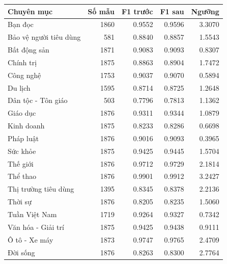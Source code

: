 \begin{tabularx}{\textwidth}{Xrrrr}\toprule
Chuyên mục & Số mẫu & F1 trước & F1 sau & Ngưỡng\\\midrule
Bạn đọc & 1860 & 0.9552 & 0.9596 & 3.3070\\
Bảo vệ người tiêu dùng & 581 & 0.8840 & 0.8857 & 1.5543\\
Bất động sản & 1871 & 0.9083 & 0.9093 & 0.8307\\
Chính trị & 1875 & 0.8863 & 0.8904 & 1.7472\\
Công nghệ & 1753 & 0.9037 & 0.9070 & 0.5894\\
Du lịch & 1595 & 0.8714 & 0.8725 & 1.2648\\
Dân tộc - Tôn giáo & 503 & 0.7796 & 0.7813 & 1.1362\\
Giáo dục & 1876 & 0.9311 & 0.9344 & 1.0879\\
Kinh doanh & 1875 & 0.8233 & 0.8286 & 0.6698\\
Pháp luật & 1876 & 0.9016 & 0.9093 & 0.3965\\
Sức khỏe & 1875 & 0.9425 & 0.9445 & 1.5704\\
Thế giới & 1876 & 0.9712 & 0.9729 & 2.1814\\
Thể thao & 1876 & 0.9901 & 0.9912 & 3.2427\\
Thị trường tiêu dùng & 1395 & 0.8345 & 0.8378 & 2.2136\\
Thời sự & 1876 & 0.8205 & 0.8235 & 1.5060\\
Tuần Việt Nam & 1719 & 0.9264 & 0.9327 & 0.7342\\
Văn hóa - Giải trí & 1875 & 0.9425 & 0.9438 & 0.9111\\
Ô tô - Xe máy & 1873 & 0.9747 & 0.9765 & 2.4709\\
Đời sống & 1876 & 0.8263 & 0.8300 & 2.7764\\
\bottomrule\end{tabularx}
